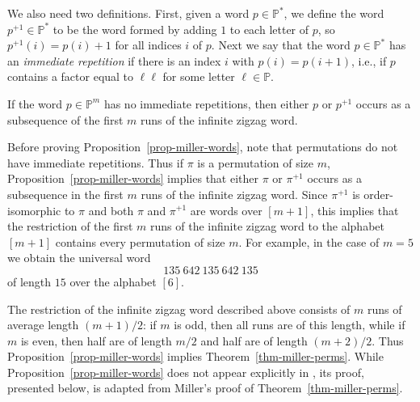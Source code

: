 We also need two definitions. First, given a word $p\in\mathbb{P}^\ast$, we define the word $p^{+1}\in\mathbb{P}^\ast$ to be the word formed by adding $1$ to each letter of $p$, so $p^{+1}(i)=p(i)+1$ for all indices $i$ of $p$. Next we say that the word $p\in\mathbb{P}^\ast$ has an \emph{immediate repetition} if there is an index $i$ with $p(i)=p(i+1)$, i.e., if $p$ contains a factor equal to $\ell\ell$ for some letter $\ell\in\mathbb{P}$.

\begin{proposition}
	\label{prop-miller-words}
	If the word $p\in\mathbb{P}^m$ has no immediate repetitions, then either $p$ or $p^{+1}$ occurs as a subsequence of the first $m$ runs of the infinite zigzag word.
\end{proposition}

Before proving Proposition~\ref{prop-miller-words}, note that permutations do not have immediate repetitions. Thus if $\pi$ is a permutation of size $m$, Proposition~\ref{prop-miller-words} implies that either $\pi$ or $\pi^{+1}$ occurs as a subsequence in the first $m$ runs of the infinite zigzag word. Since $\pi^{+1}$ is order-isomorphic to $\pi$ and both $\pi$ and $\pi^{+1}$ are words over $[m+1]$, this implies that the restriction of the first $m$ runs of the infinite zigzag word to the alphabet $[m+1]$ contains every permutation of size $m$. For example, in the case of $m=5$ we obtain the universal word
\[
	135\ 642\ 135\ 642\ 135
\]
of length $15$ over the alphabet $[6]$.

The restriction of the infinite zigzag word described above consists of $m$ runs of average length $(m+1)/2$: if $m$ is odd, then all runs are of this length, while if $m$ is even, then half are of length $m/2$ and half are of length $(m+2)/2$. Thus Proposition~\ref{prop-miller-words} implies Theorem~\ref{thm-miller-perms}. While Proposition~\ref{prop-miller-words} does not appear explicitly in \cite{miller:asymptotic-boun:}, its proof, presented below, is adapted from Miller's proof of Theorem~\ref{thm-miller-perms}.

